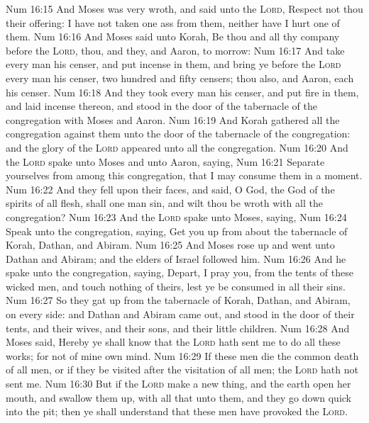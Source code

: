 \vs Num 16:15 And Moses was very wroth, and said unto the \textsc{Lord}, Respect not thou their offering: I have not taken one ass from them, neither have I hurt one of them.
\vs Num 16:16 And Moses said unto Korah, Be thou and all thy company before the \textsc{Lord}, thou, and they, and Aaron, to morrow:
\vs Num 16:17 And take every man his censer, and put incense in them, and bring ye before the \textsc{Lord} every man his censer, two hundred and fifty censers; thou also, and Aaron, each  his censer.
\vs Num 16:18 And they took every man his censer, and put fire in them, and laid incense thereon, and stood in the door of the tabernacle of the congregation with Moses and Aaron.
\vs Num 16:19 And Korah gathered all the congregation against them unto the door of the tabernacle of the congregation: and the glory of the \textsc{Lord} appeared unto all the congregation.
\vs Num 16:20 And the \textsc{Lord} spake unto Moses and unto Aaron, saying,
\vs Num 16:21 Separate yourselves from among this congregation, that I may consume them in a moment.
\vs Num 16:22 And they fell upon their faces, and said, O God, the God of the spirits of all flesh, shall one man sin, and wilt thou be wroth with all the congregation?
\vs Num 16:23 And the \textsc{Lord} spake unto Moses, saying,
\vs Num 16:24 Speak unto the congregation, saying, Get you up from about the tabernacle of Korah, Dathan, and Abiram.
\vs Num 16:25 And Moses rose up and went unto Dathan and Abiram; and the elders of Israel followed him.
\vs Num 16:26 And he spake unto the congregation, saying, Depart, I pray you, from the tents of these wicked men, and touch nothing of theirs, lest ye be consumed in all their sins.
\vs Num 16:27 So they gat up from the tabernacle of Korah, Dathan, and Abiram, on every side: and Dathan and Abiram came out, and stood in the door of their tents, and their wives, and their sons, and their little children.
\vs Num 16:28 And Moses said, Hereby ye shall know that the \textsc{Lord} hath sent me to do all these works; for  not  of mine own mind.
\vs Num 16:29 If these men die the common death of all men, or if they be visited after the visitation of all men;  the \textsc{Lord} hath not sent me.
\vs Num 16:30 But if the \textsc{Lord} make a new thing, and the earth open her mouth, and swallow them up, with all that  unto them, and they go down quick into the pit; then ye shall understand that these men have provoked the \textsc{Lord}.
